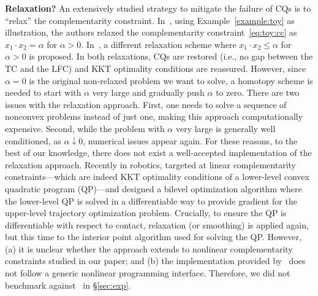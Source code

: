 \textbf{Relaxation?} An extensively studied strategy to mitigate the failure of CQs is to ``relax'' the complementarity constraint. In~\cite{MP-FACCHINEI-1999}, using Example~\ref{example:toy} as illustration, the authors relaxed the complementarity constraint~\eqref{eq:toy:cc} as $x_1\cdot x_2 = \alpha$ for $\alpha >0$. In~\cite{SIOPT-Scholtes-2001,MOR-STEFAN-2001}, a different relaxation scheme where $x_1 \cdot x_2 \leq \alpha$ for $\alpha > 0$ is proposed. In both relaxations, CQs are restored (i.e., no gap between the TC and the LFC) and KKT optimality conditions are reassured. However, since $\alpha=0$ is the original non-relaxed problem we want to solve, a homotopy scheme is needed to start with $\alpha$ very large and gradually push $\alpha$ to zero. There are two issues with the relaxation approach. First, one needs to solve a sequence of nonconvex problems instead of just one, making this approach computationally expensive. Second, while the problem with $\alpha$ very large is generally well conditioned, as $\alpha \downarrow 0$, numerical issues appear again. For these reasons, to the best of our knowledge, there does not exist a well-accepted implementation of the relaxation approach. Recently in robotics, \cite{le2024fast} targeted at linear complementarity constraints---which are indeed KKT optimality conditions of a lower-level convex quadratic program (QP)---and designed a bilevel optimization algorithm where the lower-level QP is solved in a differentiable way to provide gradient for the upper-level trajectory optimization problem. Crucially, to ensure the QP is differentiable with respect to contact, relaxation (or smoothing) is applied again, but this time to the interior point algorithm used for solving the QP. However, (a) it is unclear whether the approach extends to nonlinear complementarity constraints studied in our paper; and (b) the implementation provided by~\cite{le2024fast} does not follow a generic nonlinear programming interface. Therefore, we did not benchmark against~\cite{le2024fast} in \S\ref{sec:exp}. 



